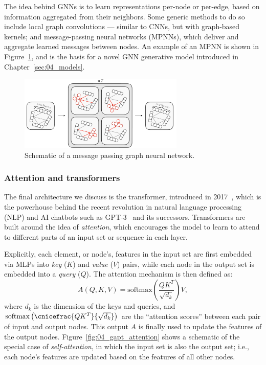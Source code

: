 The idea behind GNNs is to learn representations per-node or per-edge, based on information aggregated from their neighbors.
Some generic methods to do so include local graph convolutions --- similar to CNNs, but with graph-based kernels; and message-passing neural networks (MPNNs), which deliver and aggregate learned messages between nodes.
An example of an MPNN is shown in Figure~\ref{fig:03_ml_gnn}, and is the basis for a novel GNN generative model introduced in Chapter~\ref{sec:04_models}.

\begin{figure}[ht]
    \centering
    \captionsetup{justification=centering}
    \includegraphics[width=0.7\textwidth]{figures/06-ML4Jets/equivariantnns/mpnn_box_line.pdf}
    \caption{Schematic of a message passing graph neural network.}
    \label{fig:03_ml_gnn}
\end{figure}


\subsubsection{Attention and transformers}

The final architecture we discuss is the transformer, introduced in 2017~\cite{vaswani2017attention}, which is the powerhouse behind the recent revolution in natural language processing (NLP) and AI chatbots such as GPT-3~\cite{brown2020language} and its successors.
Transformers are built around the idea of \textit{attention}, which encourages the model to learn to attend to different parts of an input set or sequence in each layer.

Explicitly, each element, or node's, features in the input set are first embedded via MLPs into \textit{key} ($K$) and \textit{value} ($V$) pairs, while each node in the output set is embedded into a \textit{query} ($Q$).
The attention mechanism is then defined as:
\begin{equation}
    \label{eq:03_ml_attention}
    A(Q, K, V) = \mathrm{softmax}\left(\frac{QK^T}{\sqrt{d_k}}\right)V,
\end{equation}
where $d_k$ is the dimension of the keys and queries, and $\mathrm{softmax}\left(\cnicefrac{QK^T}{\sqrt{d_k}}\right)$ are the ``attention scores'' between each pair of input and output nodes.
This output $A$ is finally used to update the features of the output nodes.
Figure~\ref{fig:04_gapt_attention} shows a schematic of the special case of \textit{self-attention}, in which the input set is also the output set; i.e., each node's features are updated based on the features of all other nodes.

